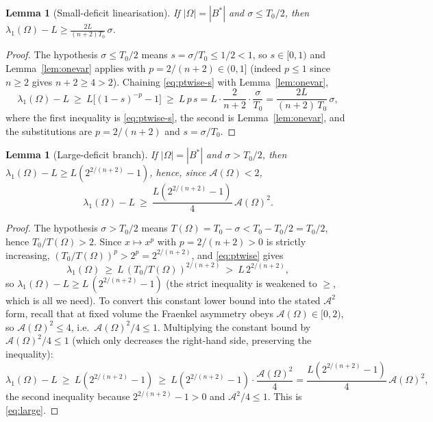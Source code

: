 \documentclass[11pt]{amsart}
\newtheorem{lemma}[theorem]{Lemma}
\theoremstyle{definition}
\newcommand{\Om}{\Omega}
\newcommand{\Fr}{\mathcal A}
\newcommand{\abs}[1]{\left|#1\right|}
\begin{document}
\begin{lemma}[Small-deficit linearisation]\label{lem:small}
If $\abs\Om=\abs{B^*}$ and $\sigma\le T_0/2$, then
$\displaystyle\lambda_1(\Om)-L\ge\frac{2L}{(n+2)T_0}\,\sigma$.
\end{lemma}

\begin{proof}
The hypothesis $\sigma\le T_0/2$ means $s=\sigma/T_0\le1/2<1$, so
$s\in[0,1)$ and Lemma~\ref{lem:onevar} applies with $p=2/(n+2)\in(0,1]$
(indeed $p\le1$ since $n\ge2$ gives $n+2\ge4>2$). Chaining
\eqref{eq:ptwise-s} with Lemma~\ref{lem:onevar},
\[
  \lambda_1(\Om)-L
  \ \ge\ L\bigl[(1-s)^{-p}-1\bigr]
  \ \ge\ L\,p\,s
  =L\cdot\frac{2}{n+2}\cdot\frac{\sigma}{T_0}
  =\frac{2L}{(n+2)\,T_0}\,\sigma,
\]
where the first inequality is \eqref{eq:ptwise-s}, the second is
Lemma~\ref{lem:onevar}, and the substitutions are $p=2/(n+2)$ and
$s=\sigma/T_0$.
\end{proof}

\begin{lemma}[Large-deficit branch]\label{lem:large}
If $\abs\Om=\abs{B^*}$ and $\sigma>T_0/2$, then
$\lambda_1(\Om)-L\ge L(2^{2/(n+2)}-1)$, hence, since $\Fr(\Om)<2$,
\begin{equation}\label{eq:large}
  \lambda_1(\Om)-L\ \ge\ \frac{L(2^{2/(n+2)}-1)}{4}\,\Fr(\Om)^2 .
\end{equation}
\end{lemma}

\begin{proof}
The hypothesis $\sigma>T_0/2$ means $T(\Om)=T_0-\sigma<T_0-T_0/2=T_0/2$,
hence $T_0/T(\Om)>2$. Since $x\mapsto x^{p}$ with $p=2/(n+2)>0$ is strictly
increasing, $(T_0/T(\Om))^{p}>2^{p}=2^{2/(n+2)}$, and \eqref{eq:ptwise}
gives
\[
  \lambda_1(\Om)\ \ge\ L\,(T_0/T(\Om))^{2/(n+2)}\ >\ L\,2^{2/(n+2)},
\]
so $\lambda_1(\Om)-L\ge L\,(2^{2/(n+2)}-1)$ (the strict inequality is
weakened to $\ge$, which is all we need). To convert this constant lower
bound into the stated $\Fr^2$ form, recall that at fixed volume the Fraenkel
asymmetry obeys $\Fr(\Om)\in[0,2)$, so $\Fr(\Om)^2\le4$, i.e.\
$\Fr(\Om)^2/4\le1$. Multiplying the constant bound by $\Fr(\Om)^2/4\le1$
(which only decreases the right-hand side, preserving the inequality):
\[
  \lambda_1(\Om)-L\ \ge\ L(2^{2/(n+2)}-1)
  \ \ge\ L(2^{2/(n+2)}-1)\cdot\frac{\Fr(\Om)^2}{4}
  =\frac{L(2^{2/(n+2)}-1)}{4}\,\Fr(\Om)^2 ,
\]
the second inequality because $2^{2/(n+2)}-1>0$ and $\Fr^2/4\le1$. This is
\eqref{eq:large}.
\end{proof}
\end{document}
